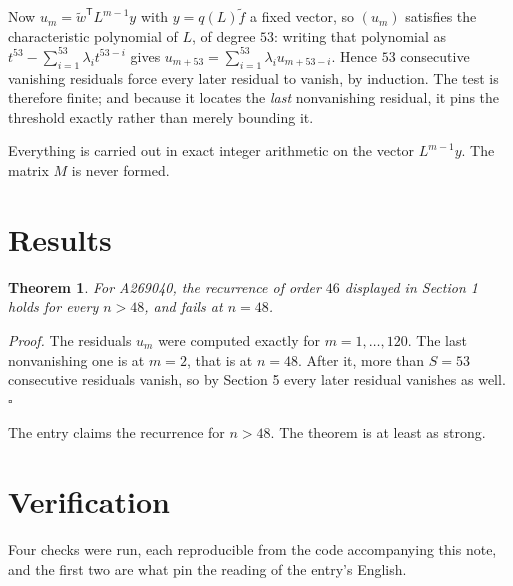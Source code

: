 \documentclass[11pt]{article}
\newtheorem{theorem}{Theorem}
\theoremstyle{definition}
\begin{document}
Now $u_m = \tilde w^{\mathsf T} L^{m-1} y$ with $y = q(L)\tilde f$ a fixed vector, so $(u_m)$ satisfies the characteristic polynomial of $L$, of degree $53$: writing that polynomial as $t^{53} - \sum_{i=1}^{53} \lambda_i t^{53-i}$ gives $u_{m+53} = \sum_{i=1}^{53} \lambda_i u_{m+53-i}$. Hence $53$ consecutive vanishing residuals force every later residual to vanish, by induction. The test is therefore finite; and because it locates the {\itshape last} nonvanishing residual, it pins the threshold exactly rather than merely bounding it.

Everything is carried out in exact integer arithmetic on the vector $L^{m-1}y$. The matrix $M$ is never formed.

\section{Results}

\begin{theorem} For A269040, the recurrence of order $46$ displayed in Section 1 holds for every $n > 48$, and fails at $n = 48$.\end{theorem}

{\itshape Proof.} The residuals $u_m$ were computed exactly for $m = 1,\dots,120$. The last nonvanishing one is at $m = 2$, that is at $n = 48$. After it, more than $S = 53$ consecutive residuals vanish, so by Section 5 every later residual vanishes as well. $\square$

The entry claims the recurrence for $n > 48$. The theorem is at least as strong.

\section{Verification}

Four checks were run, each reproducible from the code accompanying this note, and the first two are what pin the reading of the entry's English.
\end{document}
